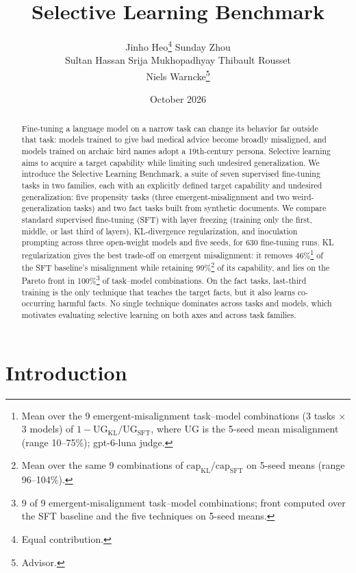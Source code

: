 \documentclass[11pt]{article}
\title{Selective Learning Benchmark}
\author{
  Jinho Heo\thanks{Equal contribution.}\quad
  Sunday Zhou\footnotemark[1] \\[4pt]
  Sultan Hassan \quad Srija Mukhopadhyay \quad Thibault Rousset \\[4pt]
  Niels Warncke\thanks{Advisor.}
}
\date{October 2026}
\renewcommand{\thefootnote}{\fnsymbol{footnote}}
\begin{document}
\maketitle
\renewcommand{\thefootnote}{\arabic{footnote}}
\setcounter{footnote}{0}

\begin{abstract}
Fine-tuning a language model on a narrow task can change its behavior far outside that task:
models trained to give bad medical advice become broadly misaligned, and models trained on
archaic bird names adopt a 19th-century persona. Selective learning aims to acquire a target
capability while limiting such undesired generalization. We introduce the Selective Learning
Benchmark, a suite of seven supervised fine-tuning tasks in two families, each with an
explicitly defined target capability and undesired generalization: five propensity tasks
(three emergent-misalignment and two weird-generalization tasks) and two fact tasks built from
synthetic documents. We compare standard supervised fine-tuning (SFT) with layer freezing
(training only the first, middle, or last third of layers), KL-divergence regularization, and
inoculation prompting across three open-weight models and five seeds, for 630 fine-tuning runs.
KL regularization gives the best trade-off on emergent misalignment: it removes
46\%\footnote{Mean over the 9 emergent-misalignment task--model combinations (3 tasks $\times$
3 models) of $1 - \mathrm{UG}_{\mathrm{KL}}/\mathrm{UG}_{\mathrm{SFT}}$, where UG is the 5-seed
mean misalignment (range 10--75\%); gpt-6-luna judge.} of the SFT baseline's misalignment while
retaining 99\%\footnote{Mean over the same 9 combinations of
$\mathrm{cap}_{\mathrm{KL}}/\mathrm{cap}_{\mathrm{SFT}}$ on 5-seed means (range 96--104\%).} of its
capability, and lies on the Pareto front in 100\%\footnote{9 of 9 emergent-misalignment
task--model combinations; front computed over the SFT baseline and the five techniques on 5-seed
means.} of task--model combinations. On the fact tasks, last-third training is the only
technique that teaches the target facts, but it also learns co-occurring harmful facts. No single
technique dominates across tasks and models, which motivates evaluating selective learning on
both axes and across task families.
\end{abstract}

\section{Introduction}
\end{document}
